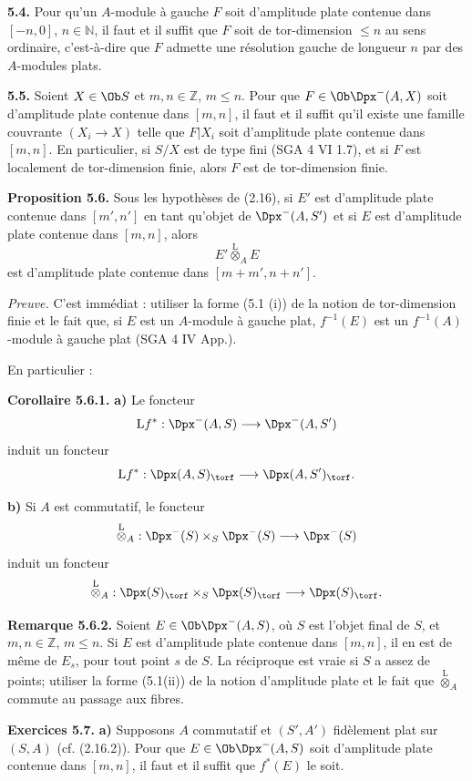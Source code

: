 \documentclass[11pt]{article}
\begin{document}
\textbf{5.4.} Pour qu'un \(A\)-module à gauche \(F\) soit d'amplitude plate contenue dans \([-n,0]\), \(n\in\mathbb N\), il faut et il suffit que \(F\) soit de tor-dimension \(\leq n\) au sens ordinaire, c'est-à-dire que \(F\) admette une résolution gauche de longueur \(n\) par des \(A\)-modules plats.

\textbf{5.5.} Soient \(X\in\Ob S\) et \(m,n\in\mathbb Z\), \(m\leq n\). Pour que \(F\in\Ob\Dpx^-(A,X)\) soit d'amplitude plate contenue dans \([m,n]\), il faut et il suffit qu'il existe une famille couvrante \((X_i\to X)\) telle que \(F|X_i\) soit d'amplitude plate contenue dans \([m,n]\). En particulier, si \(S/X\) est de type fini (SGA 4 VI 1.7), et si \(F\) est localement de tor-dimension finie, alors \(F\) est de tor-dimension finie.

\textbf{Proposition 5.6.} Sous les hypothèses de (2.16), si \(E'\) est d'amplitude plate contenue dans \([m',n']\) en tant qu'objet de \(\Dpx^-(A,S')\) et si \(E\) est d'amplitude plate contenue dans \([m,n]\), alors
\[
  E'\overset{\mathrm L}{\otimes}_A E
\]
est d'amplitude plate contenue dans \([m+m',n+n']\).

\emph{Preuve.} C'est immédiat : utiliser la forme (5.1 (i)) de la notion de tor-dimension finie et le fait que, si \(E\) est un \(A\)-module à gauche plat, \(f^{-1}(E)\) est un \(f^{-1}(A)\)-module à gauche plat (SGA 4 IV App.).

En particulier :

\textbf{Corollaire 5.6.1.} \textbf{a)} Le foncteur
\[
  \mathrm L f^*:\Dpx^-(A,S)\longrightarrow \Dpx^-(A,S')
\]
induit un foncteur
\[
  \mathrm L f^*:\Dpx(A,S)_{\torf}\longrightarrow \Dpx(A,S')_{\torf}.
\]

\textbf{b)} Si \(A\) est commutatif, le foncteur
\[
  \overset{\mathrm L}{\otimes}_A:
  \Dpx^-(S)\times_S\Dpx^-(S)
  \longrightarrow \Dpx^-(S)
\]
induit un foncteur
\[
  \overset{\mathrm L}{\otimes}_A:
  \Dpx(S)_{\torf}\times_S\Dpx(S)_{\torf}
  \longrightarrow \Dpx(S)_{\torf}.
\]

\textbf{Remarque 5.6.2.} Soient \(E\in\Ob\Dpx^-(A,S)\), où \(S\) est l'objet final de \(S\), et \(m,n\in\mathbb Z\), \(m\leq n\). Si \(E\) est d'amplitude plate contenue dans \([m,n]\), il en est de même de \(E_s\), pour tout point \(s\) de \(S\). La réciproque est vraie si \(S\) a assez de points; utiliser la forme (5.1(ii)) de la notion d'amplitude plate et le fait que \(\overset{\mathrm L}{\otimes}_A\) commute au passage aux fibres.

\textbf{Exercices 5.7.} \textbf{a)} Supposons \(A\) commutatif et \((S',A')\) fidèlement plat sur \((S,A)\) (cf. (2.16.2)). Pour que \(E\in\Ob\Dpx^-(A,S)\) soit d'amplitude plate contenue dans \([m,n]\), il faut et il suffit que \(f^*(E)\) le soit.
\end{document}

